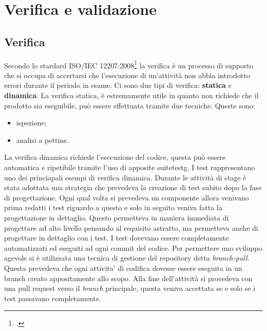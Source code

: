 
\chapter{Verifica e validazione}
\label{cap:verifica-validazione}
\section{Verifica}
Secondo lo stardard ISO/IEC 12207:2008\footcite{ISO:Systems-and-software-engineering} la verifica è un processo di supporto che si occupa di accertarsi che l’esecuzione di un'attività non abbia introdotto errori durante il periodo in esame. 
Ci sono due tipi di verifica: \textbf{statica} e \textbf{dinamica}.
La verifica statica, è estremamente utile in quanto non richiede che il prodotto sia eseguibile, può essere effettuata tramite due tecniche. Queste sono:
\begin{itemize}
    \item ispezione;
    \item analisi a pettine.
\end{itemize}
La verifica dinamica richiede l'esecuzione del codice, questa può essere automatica e ripetibile tramite l'uso di apposite \gls{suitetestg}\glsfirstoccur. I test rappresentano uno dei princiapali esempi di verifica dinamica. Durante le attività di stage è stata adottata una strategia che prevedeva la creazione di test subito dopo la fase di progettazione. Ogni qual volta si prevedeva un componente allora venivano prima redatti i test riguardo a questo e solo in seguito veniva fatta la progettazione in dettaglio. Questo permetteva in maniera immediata di progettare ad alto livello pensando al requisito astratto, ma permetteva anche di progettare in dettaglio con i test.
I test dovevano essere completamente automatizzati ed eseguiti ad ogni commit del codice. 
Per permettere uno sviluppo agevole si è utilizzata una tecnica di gestione del repository detta \emph{branch-pull}.
Questa prevedeva che ogni attivita’ di codifica dovesse essere eseguita in un branch creato appositamente allo scopo. Alla fine dell'attività si procedeva con una pull request verso il \emph{branch} principale, questa veniva accettata se e solo se i test passavano completamente. 

